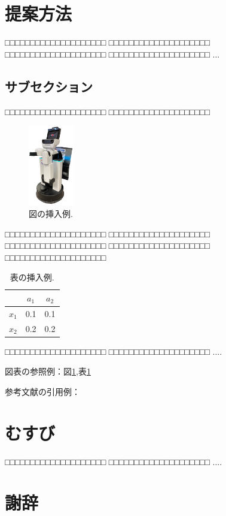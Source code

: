 \documentclass[a4j]{jarticle}
\begin{document}
\section{提案方法}

□□□□□□□□□□□□□□□□□□□□
□□□□□□□□□□□□□□□□□□□□
□□□□□□□□□□□□□□□□□□□□
□□□□□□□□□□□□□□□□□□□□
...

\subsection{サブセクション}
□□□□□□□□□□□□□□□□□□□□
□□□□□□□□□□□□□□□□□□□□
%
\begin{figure}[ht]
  \centering
  \includegraphics[width=2cm]{images/hsr_front.png}
  \caption{図の挿入例.}
  \label{fig:ex1}
\end{figure}
%
□□□□□□□□□□□□□□□□□□□□
□□□□□□□□□□□□□□□□□□□□
□□□□□□□□□□□□□□□□□□□□
□□□□□□□□□□□□□□□□□□□□
□□□□□□□□□□□□□□□□□□□□
%
\begin{table}[h]
  \centering
  \caption {表の挿入例.}
  \label{table:ex1}
  \begin{tabular}{c|cc}
    \hline
           & $a_1$ & $a_2$ \\ \hline
    $x_1$  &  0.1  &  0.1  \\
    $x_2$  &  0.2  &  0.2  \\ \hline
  \end{tabular}
\end{table}
%
□□□□□□□□□□□□□□□□□□□□
□□□□□□□□□□□□□□□□□□□□
....

図表の参照例：図\ref{fig:ex1},表\ref{fig:ex1}

参考文献の引用例：\cite{Sample1}\cite{Sample2}


\section{むすび}
□□□□□□□□□□□□□□□□□□□□
□□□□□□□□□□□□□□□□□□□□
....


\section*{謝辞}
\end{document}

